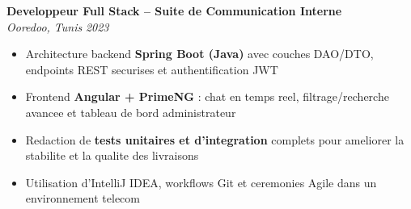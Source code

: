 \documentclass[10pt,a4paper]{article}
\begin{document}
{\vspace{4pt}
\textbf{Developpeur Full Stack -- Suite de Communication Interne} \\[1pt]
\textit{Ooredoo, Tunis} \hfill \textit{2023}
\begin{itemize}
  \item Architecture backend \textbf{Spring Boot (Java)} avec couches DAO/DTO, endpoints REST securises et authentification JWT
  \item Frontend \textbf{Angular + PrimeNG} : chat en temps reel, filtrage/recherche avancee et tableau de bord administrateur
  \item Redaction de \textbf{tests unitaires et d'integration} complets pour ameliorer la stabilite et la qualite des livraisons
  \item Utilisation d'IntelliJ IDEA, workflows Git et ceremonies Agile dans un environnement telecom
\end{itemize}

}

\end{document}

